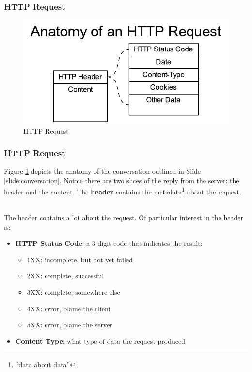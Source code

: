\documentclass[aspectratio=169]{beamer}
\begin{document}
\begin{frame}
\frametitle{HTTP Request}
\begin{figure}
\includegraphics[scale=0.85]{../artifacts/http-request.pdf}
\caption{HTTP Request}
\label{fig:http-request}
\end{figure}
\end{frame}

\begin{frame}
\frametitle{HTTP Request}
Figure \ref{fig:http-request} depicts the anatomy of the conversation outlined in Slide \ref{slide:conversation}. Notice there are two slices of the reply from the server: the header and the content. The \textbf{header} contains the metadata\footnote{``data about data''} about the request.

\mbox{}\\
The header contains a lot about the request. Of particular interest in the header is:
\begin{itemize}
	\item \textbf{HTTP Status Code}: a 3 digit code that indicates the result:
	\begin{itemize}
		\item 1XX: incomplete, but not yet failed
		\item 2XX: complete, successful
		\item 3XX: complete, somewhere else
		\item 4XX: error, blame the client
		\item 5XX: error, blame the server
	\end{itemize}
	\item \textbf{Content Type}: what type of data the request produced
\end{itemize}
\end{frame}
\end{document}
